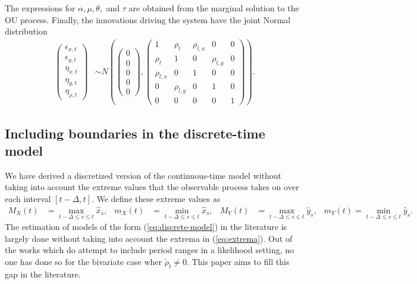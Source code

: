 \documentclass[10pt]{article}
\begin{document}
The expressions for $\alpha, \mu, \theta,$ and $\tau$ are obtained
from the marginal solution to the OU process. Finally, the innovations
driving the system have the joint Normal distribution
\begin{align}
  \left( \begin{array}{c}
           \epsilon_{x,t} \\
           \epsilon_{y,t} \\
           \eta_{x,t} \\
           \eta_{y,t} \\
           \eta_{\rho,t}
         \end{array} \right) &\sim N\left(
                               \left( \begin{array}{c}
                                        0\\
                                        0\\
                                        0\\
                                        0\\
                                        0
                                      \end{array} \right),
  \left( \begin{array}{ccccc}
           1 & \rho_t & \rho_{l,x} & 0 & 0 \\
           \rho_t & 1 & 0 & \rho_{l,y} & 0 \\
           \rho_{l,x} & 0 & 1 & 0 & 0 \\
           0 & \rho_{l,y} & 0 & 1 & 0 \\
           0 & 0 & 0 & 0 & 1
           \end{array} \right) \right). \label{eq:marginal-errors}
\end{align}

\subsection{Including boundaries in the discrete-time model}
We have derived a discretized version of the continuous-time model
without taking into account the extreme values that the observable process takes on over each interval $[t-\Delta, t]$. We define these extreme values as
\begin{align}
M_X(t) &=\max_{t-\Delta\leq s\leq t}\hat{x}_s, & m_X(t) &=\min_{t-\Delta\leq s\leq t}\hat{x}_s, &
M_Y(t) &=\max_{t-\Delta\leq s\leq t}\hat{y}_s, & m_Y(t)=\min_{t-\Delta \leq s\leq t}\hat{y}_s. \label{eq:extrema}
\end{align}
The estimation of models of the form (\ref{eq:discrete-model}) in the
literature is largely done without taking into account the extrema in
(\ref{eq:extrema}). Out of the works which do attempt to include
period ranges in a likelihood setting, no one has done so for the
bivariate case wher $\tilde{\rho}_t \neq 0$. This paper aims to fill
this gap in the literature.
\end{document}
